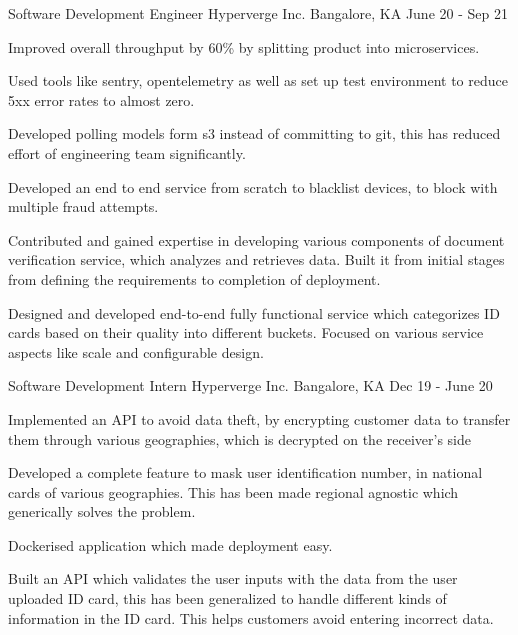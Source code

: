 \begin{cventries}
  \cventry
    {Software Development Engineer}
    {Hyperverge Inc.}
    {Bangalore, KA}
    {June 20 - Sep 21}
    {
      \begin{cvitems}
        \item {Improved overall throughput by 60\% by splitting product into microservices.}
        \item {Used tools like sentry, opentelemetry as well as set up test environment to reduce 5xx error rates to almost zero.}
        \item {Developed polling models form s3 instead of committing to git, this has reduced effort of engineering team significantly.}
        \item {Developed an end to end service from scratch to blacklist devices, to block with multiple fraud attempts.}
        \item {Contributed and gained expertise in developing various components of document verification service, which analyzes and retrieves data. Built it from initial stages from defining the requirements to completion of deployment.}
        \item {Designed and developed end-to-end fully functional service which categorizes ID cards based on their quality into different buckets. Focused on various service aspects like scale and configurable design.}
      \end{cvitems}
    }

  \cventry
    {Software Development Intern}
    {Hyperverge Inc.}
    {Bangalore, KA}
    {Dec 19 - June 20}
    {
      \begin{cvitems}
        \item {Implemented an API to avoid data theft, by encrypting customer data to transfer them through various geographies, which is decrypted on the receiver's side}
        \item {Developed a complete feature to mask user identification number, in national cards of various geographies. This has been made regional agnostic which generically solves the problem.}
        \item {Dockerised application which made deployment easy.}
        \item {Built an API which validates the user inputs with the data from the user uploaded ID card, this has been generalized to handle different kinds of information in the ID card. This helps customers avoid entering incorrect data.}
      \end{cvitems}
    }

\end{cventries}
